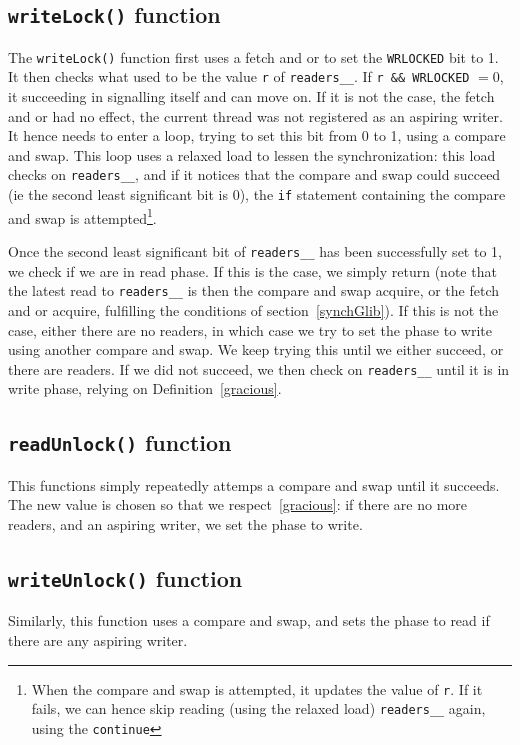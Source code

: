 		\subsection{\texttt{writeLock()} function}

		The \texttt{writeLock()} function first uses a fetch and or to set the \texttt{WRLOCKED} bit to 1. It then checks what used to be the value \texttt{r} of \texttt{readers\_\_}. If \texttt{r \&\& WRLOCKED} $= 0$, it succeeding in signalling itself and can move on. If it is not the case, the fetch and or had no effect, the current thread was not registered as an aspiring writer. It hence needs to enter a loop, trying to set this bit from 0 to 1, using a compare and swap. This loop uses a relaxed load to lessen the synchronization: this load checks on \texttt{readers\_\_}, and if it notices that the compare and swap could succeed (ie the second least significant bit is 0), the \texttt{if} statement containing the compare and swap is attempted\footnote{When the compare and swap is attempted, it updates the value of \texttt{r}. If it fails, we can hence skip reading (using the relaxed load) \texttt{readers\_\_} again, using the \texttt{continue}}. 

		Once the second least significant bit of \texttt{readers\_\_} has been successfully set to 1, we check if we are in read phase. If this is the case, we simply return (note that the latest read to \texttt{readers\_\_} is then the compare and swap acquire, or the fetch and or acquire, fulfilling the conditions of section~\ref{synchGlib}). If this is not the case, either there are no readers, in which case we try to set the phase to write using another compare and swap. We keep trying this until we either succeed, or there are readers. If we did not succeed, we then check on \texttt{readers\_\_} until it is in write phase, relying on Definition~\ref{gracious}.

		\subsection{\texttt{readUnlock()} function}

		This functions simply repeatedly attemps a compare and swap until it succeeds. The new value is chosen so that we respect~\ref{gracious}: if there are no more readers, and an aspiring writer, we set the phase to write.

		\subsection{\texttt{writeUnlock()} function}

		Similarly, this function uses a compare and swap, and sets the phase to read if there are any aspiring writer.
